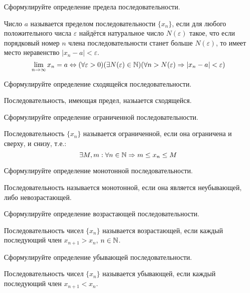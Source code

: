 \begin{question}
  Сформулируйте определение предела последовательности.
\end{question}
\begin{answer}
 Число $a$ называется пределом последовательности $\{x_{n}\}$, если для любого положительного числа $\varepsilon$ найдётся натуральное число $N(\varepsilon)$ такое, что если порядковый номер $n$ члена последовательности станет больше $N(\varepsilon)$, то имеет место неравенство $|x_{n} - a| < \varepsilon$.\[
 \lim_{n \to \infty} x_{n} = a \iff (\forall \varepsilon > 0)(\exists N(\varepsilon) \in \N)(\forall  n > N(\varepsilon) \implies |x_{n} - a| < \varepsilon) 
 \] 
\end{answer}

\begin{question}
  Сформулируйте определение сходящейся последовательности.
\end{question}
\begin{answer}
  Последовательность, имеющая предел, назыается сходящейся.
\end{answer}

\begin{question}
  Сформулируйте определение ограниченной последовательности.
\end{question}
\begin{answer}
  Последовательность $\{x_{n}\}$ называется ограниченной, если она ограничена и сверху, и снизу, т.е.: \[
  \exists M, m : \forall n \in \mathbb{N} \Rightarrow m \le x_{n} \le M
  \] 
\end{answer}

\begin{question}
  Сформулируйте определение монотонной последовательности.
\end{question}
\begin{answer}
  Последовательность называется монотонной, если она является неубывающей, либо невозрастающей.
\end{answer}

\begin{question}
  Сформулируйте определение возрастающей последовательности.
\end{question}
\begin{answer}
  Последовательность чисел $\{x_n\}$ называется возрастающей, если каждый последующий член $x_{n+1} > x_{n}$, $n \in \mathbb{N}$.
\end{answer}

\begin{question}
  Сформулируйте определение убывающей последовательности.
\end{question}
\begin{answer}
  Последовательность чисел $\{x_{n}\}$ называется убывающей, если каждый последующий член $x_{n+1} < x_{n}$.
\end{answer}

